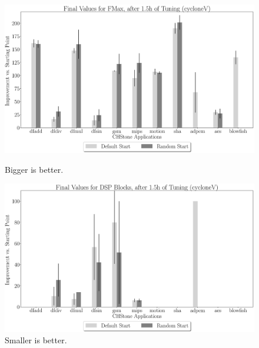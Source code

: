 \documentclass[12pt, a4paper]{article}
\begin{document}
\begin{figure}[htpb]
    \centering
    \begin{minipage}{.48\textwidth}
        \centering
        \includegraphics[width=.8\textwidth]{abs_comp_fmax_5400_chstone_cycloneV}
        \caption{Bigger is better.}
    \end{minipage}%
    \begin{minipage}{.48\textwidth}
        \centering
        \includegraphics[width=.8\textwidth]{abs_comp_dsp_5400_chstone_cycloneV}
        \caption{Smaller is better.}
    \end{minipage}%


\end{figure}
\end{document}
